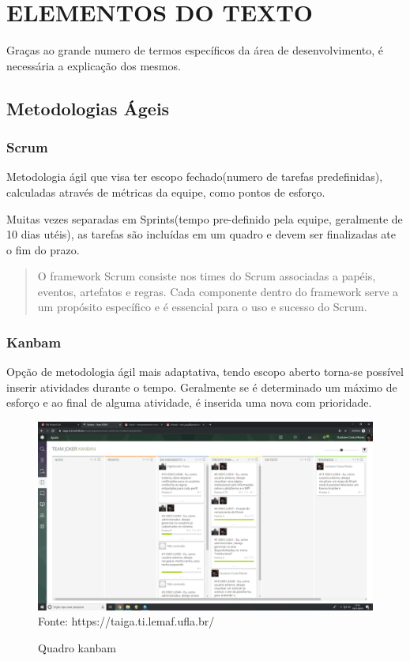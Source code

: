 \chapter{ELEMENTOS DO TEXTO}
\label{cap:elementos}

Graças ao grande numero de termos específicos da área de desenvolvimento, é necessária a explicação dos mesmos.

\section{Metodologias Ágeis}

\subsection{Scrum}

Metodologia ágil que visa ter escopo fechado(numero de tarefas predefinidas), calculadas através de métricas da equipe, como pontos de esforço.

Muitas vezes separadas em Sprints(tempo pre-definido pela equipe, geralmente de 10 dias utéis), as tarefas são incluídas em um quadro e devem ser finalizadas ate o fim do prazo.

\begin{quote}
  O framework Scrum consiste nos times do Scrum associadas a papéis, eventos, artefatos e
  regras. Cada componente dentro do framework serve a um propósito específico e é essencial
  para o uso e sucesso do Scrum.
\end{quote}

\subsection{Kanbam}
  Opção de metodologia ágil mais adaptativa, tendo escopo aberto torna-se possível inserir atividades durante o tempo.
  Geralmente se é determinado um máximo de esforço e ao final de alguma atividade, é inserida uma nova com prioridade.
\begin{figure}[!htb]
\centering
\caption{Quadro kanbam} %
\includegraphics[scale=0.2]{quadroKanbam}\\  %
{\small Fonte: https://taiga.ti.lemaf.ufla.br/} %
\label{fig:exemplo} %
\end{figure}

